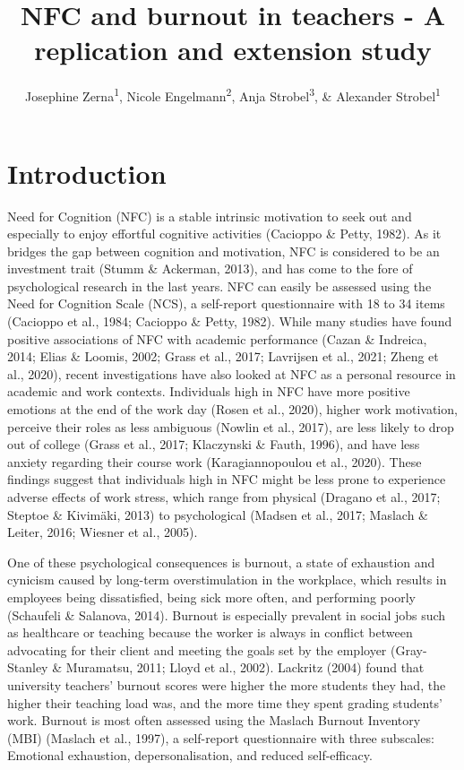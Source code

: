 \documentclass[
  english,
  man]{apa6}
\title{NFC and burnout in teachers - A replication and extension study}
\author{Josephine Zerna\textsuperscript{1}, Nicole Engelmann\textsuperscript{2}, Anja Strobel\textsuperscript{3}, \& Alexander Strobel\textsuperscript{1}}
\date{}
\affiliation{\vspace{0.5cm}\textsuperscript{1} Faculty of Psychology, Technische Universität Dresden\\\textsuperscript{2} Faculty of Education, Technische Universität Dresden\\\textsuperscript{3} Institute of Psychology, Chemnitz University of Technology}
\begin{document}
\maketitle

\hypertarget{introduction}{%
\section{Introduction}\label{introduction}}

Need for Cognition (NFC) is a stable intrinsic motivation to seek out and especially to enjoy effortful cognitive activities (Cacioppo \& Petty, 1982).
As it bridges the gap between cognition and motivation, NFC is considered to be an investment trait (Stumm \& Ackerman, 2013), and has come to the fore of psychological research in the last years.
NFC can easily be assessed using the Need for Cognition Scale (NCS), a self-report questionnaire with 18 to 34 items (Cacioppo et al., 1984; Cacioppo \& Petty, 1982).
While many studies have found positive associations of NFC with academic performance (Cazan \& Indreica, 2014; Elias \& Loomis, 2002; Grass et al., 2017; Lavrijsen et al., 2021; Zheng et al., 2020), recent investigations have also looked at NFC as a personal resource in academic and work contexts.
Individuals high in NFC have more positive emotions at the end of the work day (Rosen et al., 2020), higher work motivation, perceive their roles as less ambiguous (Nowlin et al., 2017), are less likely to drop out of college (Grass et al., 2017; Klaczynski \& Fauth, 1996), and have less anxiety regarding their course work (Karagiannopoulou et al., 2020).
These findings suggest that individuals high in NFC might be less prone to experience adverse effects of work stress, which range from physical (Dragano et al., 2017; Steptoe \& Kivimäki, 2013) to psychological (Madsen et al., 2017; Maslach \& Leiter, 2016; Wiesner et al., 2005).

One of these psychological consequences is burnout, a state of exhaustion and cynicism caused by long-term overstimulation in the workplace, which results in employees being dissatisfied, being sick more often, and performing poorly (Schaufeli \& Salanova, 2014).
Burnout is especially prevalent in social jobs such as healthcare or teaching because the worker is always in conflict between advocating for their client and meeting the goals set by the employer (Gray-Stanley \& Muramatsu, 2011; Lloyd et al., 2002).
Lackritz (2004) found that university teachers' burnout scores were higher the more students they had, the higher their teaching load was, and the more time they spent grading students' work.
Burnout is most often assessed using the Maslach Burnout Inventory (MBI) (Maslach et al., 1997), a self-report questionnaire with three subscales: Emotional exhaustion, depersonalisation, and reduced self-efficacy.
\end{document}
